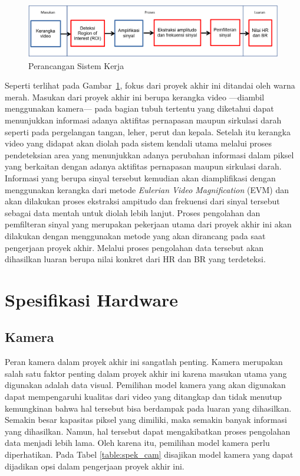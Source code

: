 \begin{figure}[ht]
 \vspace{0.5em}
 \centering
 \includegraphics[width=\textwidth]{diagramblok}
 \caption{Perancangan Sistem Kerja}
 \label{fig:diagramblok}   
\end{figure}

Seperti terlihat pada Gambar~\ref{fig:diagramblok}, fokus dari proyek akhir ini ditandai oleh warna merah. Masukan dari proyek akhir ini berupa kerangka video ---diambil menggunakan kamera--- pada bagian tubuh tertentu yang diketahui dapat menunjukkan informasi adanya aktifitas pernapasan maupun sirkulasi darah seperti pada pergelangan tangan, leher, perut dan kepala. Setelah itu kerangka video yang didapat akan diolah pada sistem kendali utama melalui proses pendeteksian area yang menunjukkan adanya perubahan informasi dalam piksel yang berkaitan dengan adanya aktifitas pernapasan maupun sirkulasi darah. Informasi yang berupa sinyal tersebut kemudian akan diamplifikasi dengan menggunakan kerangka dari metode \textit{Eulerian Video Magnification} (EVM) dan akan dilakukan proses ekstraksi ampitudo dan frekuensi dari sinyal tersebut sebagai data mentah untuk diolah lebih lanjut. Proses pengolahan dan pemfilteran sinyal yang merupakan pekerjaan utama dari proyek akhir ini akan dilakukan dengan menggunakan metode yang akan dirancang pada saat pengerjaan proyek akhir. Melalui proses pengolahan data tersebut akan dihasilkan luaran berupa nilai konkret dari HR dan BR yang terdeteksi.

\section{Spesifikasi Hardware}
\subsection{Kamera}
Peran kamera dalam proyek akhir ini sangatlah penting. Kamera merupakan salah satu faktor penting dalam proyek akhir ini karena masukan utama yang digunakan adalah data visual. Pemilihan model kamera yang akan digunakan dapat mempengaruhi kualitas dari video yang ditangkap dan tidak menutup kemungkinan bahwa hal tersebut bisa berdampak pada luaran yang dihasilkan. Semakin besar kapasitas piksel yang dimiliki, maka semakin banyak informasi yang dihasilkan. Namun, hal tersebut dapat mengakibatkan proses pengolahan data menjadi lebih lama. Oleh karena itu, pemilihan model kamera perlu diperhatikan. Pada Tabel \ref{table:spek_cam} disajikan model kamera yang dapat dijadikan opsi dalam pengerjaan proyek akhir ini.

